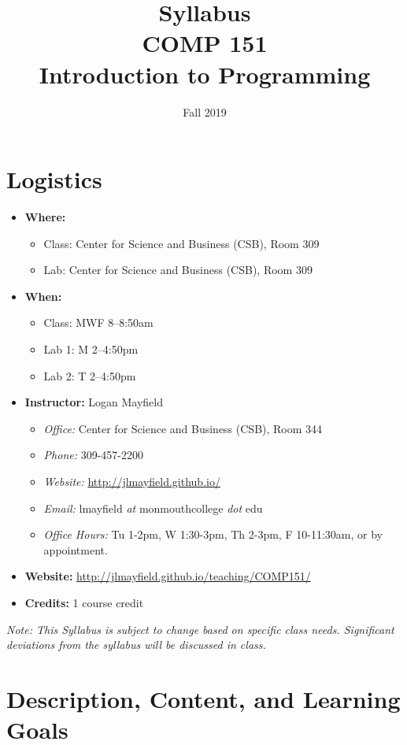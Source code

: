 \documentclass[10pt]{article}
\title{Syllabus \\ COMP 151 \\ Introduction to Programming}
\author{  }
\date{Fall 2019}
\begin{document}
\maketitle

\section{Logistics}
\begin{itemize}
\item \textbf{Where: }
\begin{itemize}
\item Class: Center for Science and Business (CSB), Room 309
\item Lab: Center for Science and Business (CSB), Room 309
\end{itemize}
\item \textbf{When: }
\begin{itemize}
  \item Class: MWF 8--8:50am
  \item Lab 1: M 2--4:50pm
  \item Lab 2: T 2--4:50pm
\end{itemize}
\item \textbf{Instructor: } Logan Mayfield
\begin{itemize}
\item \textit{Office: } Center for Science and Business (CSB), Room 344
\item \textit{Phone: } 309-457-2200 %
\item \textit{Website: } \url{http://jlmayfield.github.io/}
\item \textit{Email: } lmayfield \textit{at} monmouthcollege \textit{dot} edu
\item \textit{Office Hours: }  Tu 1-2pm, W 1:30-3pm, Th 2-3pm, F 10-11:30am, or by appointment.
\end{itemize}
\item \textbf{Website: } \url{http://jlmayfield.github.io/teaching/COMP151/}
\item \textbf{Credits: } 1 course credit
\end{itemize}
\emph{Note: This Syllabus is subject to change based on specific class needs. Significant deviations from the syllabus will be discussed in class.}


\section{Description, Content, and Learning Goals}
\end{document}
